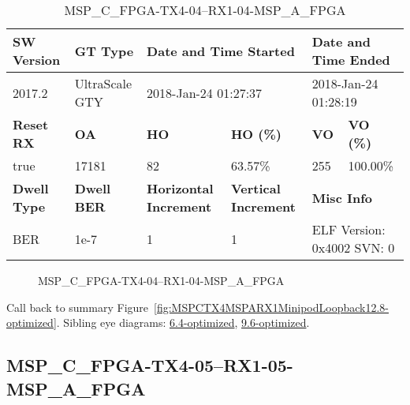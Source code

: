 \begin{table}[h]
\centering
\caption{MSP\_C\_FPGA-TX4-04--RX1-04-MSP\_A\_FPGA}
\label{tab:MSPCFPGATX404RX104MSPAFPGA12.8-optimized}
\begin{tabular}{@{}|l|l|l|l|l|l|@{}}
\toprule
\textbf{SW Version}                & \textbf{GT Type}   & \multicolumn{2}{l|}{\textbf{Date and Time Started}}            & \multicolumn{2}{l|}{\textbf{Date and Time Ended}}        \\ \midrule
2017.2                       & UltraScale GTY          & \multicolumn{2}{l|}{2018-Jan-24 01:27:37}                   & \multicolumn{2}{l|}{2018-Jan-24 01:28:19}               \\ \midrule
\textbf{Reset RX}                  & \textbf{OA} & \textbf{HO}   & \textbf{HO (\%)} & \textbf{VO} & \textbf{VO (\%)} \\ \midrule
true & 17181        & 82          & 63.57\%        & 255        & 100.00\%       \\ \midrule
\textbf{Dwell Type}                & \textbf{Dwell BER} & \textbf{Horizontal Increment} & \textbf{Vertical Increment}    & \multicolumn{2}{l|}{\textbf{Misc Info}}                  \\ \midrule
BER                            & 1e-7        & 1        & 1           & \multicolumn{2}{l|}{ELF Version: 0x4002 SVN: 0}                         \\ \bottomrule
\end{tabular}
\end{table}

\begin{figure}[h]
\caption{MSP\_C\_FPGA-TX4-04--RX1-04-MSP\_A\_FPGA} \label{fig:MSPCFPGATX404RX104MSPAFPGA12.8-optimized}
\end{figure}

Call back to summary Figure~\ref{fig:MSPCTX4MSPARX1MinipodLoopback12.8-optimized}.
Sibling eye diagrams: \hyperref[sec:MSPCFPGATX404RX104MSPAFPGA6.4-optimized]{6.4-optimized}, \hyperref[sec:MSPCFPGATX404RX104MSPAFPGA9.6-optimized]{9.6-optimized}.

\clearpage
\newpage


\subsection{MSP\_C\_FPGA-TX4-05--RX1-05-MSP\_A\_FPGA}\label{sec:MSPCFPGATX405RX105MSPAFPGA12.8-optimized}

